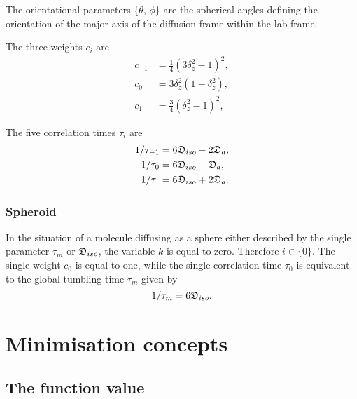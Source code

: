 \noindent The orientational parameters \{$\theta$, $\phi$\} are the spherical angles defining the orientation of the major axis of the diffusion frame within the lab frame.


The three weights $c_i$ are
\begin{subequations}
\begin{align}
 c_{-1} &= \tfrac{1}{4}(3\delta_z^2 - 1)^2, \label{eq: spheroid c-1} \\
 c_{0}  &= 3\delta_z^2(1 - \delta_z^2),     \label{eq: spheroid c0} \\
 c_{1}  &= \tfrac{3}{4}(\delta_z^2 - 1)^2,  \label{eq: spheroid c1}
\end{align}
\end{subequations}

The five correlation times $\tau_i$ are
\begin{subequations}
\begin{align}
 1/\tau_{-1} &= 6\mathfrak{D}_{iso} - 2\mathfrak{D}_a,    \label{eq: spheroid tau-1} \\
 1/\tau_{0}  &= 6\mathfrak{D}_{iso} - \mathfrak{D}_a,     \label{eq: spheroid tau0} \\
 1/\tau_{1}  &= 6\mathfrak{D}_{iso} + 2\mathfrak{D}_a.    \label{eq: spheroid tau1}
\end{align}
\end{subequations}


\subsubsection{Spheroid}
In the situation of a molecule diffusing as a sphere either described by the single parameter $\tau_m$ or $\mathfrak{D}_{iso}$, the variable $k$ is equal to zero.  Therefore $i \in \{0\}$.  The single weight $c_0$ is equal to one, while the single correlation time $\tau_0$ is equivalent to the global tumbling time $\tau_m$ given by
\begin{equation} \label{eq: sphere tau0}
 1/\tau_m = 6\mathfrak{D}_{iso}.
\end{equation}







\section{Minimisation concepts}

\subsection{The function value}

